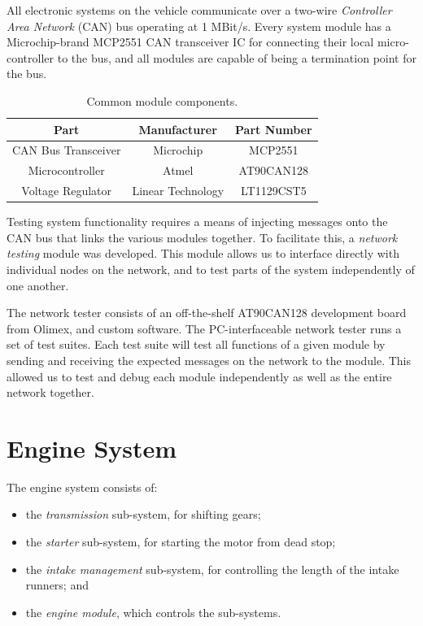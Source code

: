 
All electronic systems on the vehicle communicate over a two-wire \emph{Controller Area Network} (CAN) bus operating at 1 MBit/s. Every system module has a Microchip-brand MCP2551 CAN transceiver IC for connecting their local micro-controller to the bus, and all modules are capable of being a termination point for the bus.

\begin{table}[H]
	\caption{Common module components.}
	\label{table:common_module_components}
	\centering
	\begin{tabular}{|c|c|c|}
		\hline 
		Part & Manufacturer & Part Number\tabularnewline 
		\hline \hline
		CAN Bus Transceiver & Microchip & MCP2551\tabularnewline \hline
		Microcontroller & Atmel & AT90CAN128\tabularnewline \hline
		Voltage Regulator & Linear Technology & LT1129CST5\tabularnewline		
		\hline
	\end{tabular}
\end{table}

Testing system functionality requires a means of injecting messages onto the CAN bus that links the various modules together. To facilitate this, a \emph{network testing} module was developed. This module allows us to interface directly with individual nodes on the network, and to test parts of the system independently of one another. 

The network tester consists of an off-the-shelf AT90CAN128 development board from Olimex, and custom software. The PC-interfaceable network tester runs a set of test suites. Each test suite will test all functions of a given module by sending and receiving the expected messages on the network to the module. This allowed us to test and debug each module independently as well as the entire network together.

%
%

\section{Engine System}
\label{sec:engine_system}

The engine system consists of:

\begin{itemize}
\item the \emph{transmission} sub-system, for shifting gears;
\item the \emph{starter} sub-system, for starting the motor from dead stop; 
\item the \emph{intake management} sub-system, for controlling the length of the intake runners; and
\item the \emph{engine module}, which controls the sub-systems.
\end{itemize}

